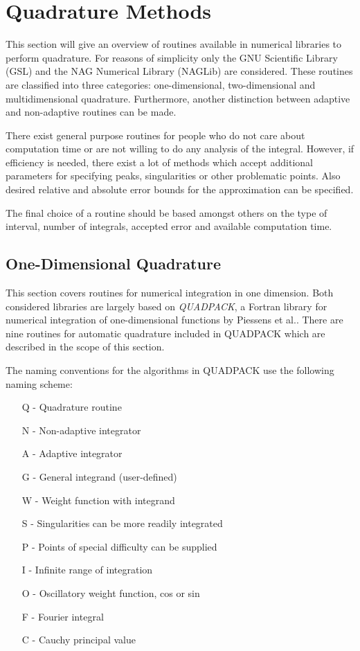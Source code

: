 \section{Quadrature Methods} \label{routines}
This section will give an overview of routines available in numerical libraries to perform quadrature.  For reasons of simplicity only the GNU Scientific Library (GSL)\cite{GSL_Reference} and the NAG Numerical Library (NAGLib)\cite{NAGlib} are considered.
These routines are classified into three categories: one-dimensional, two-dimensional and multidimensional quadrature. Furthermore, another distinction between adaptive and non-adaptive routines can be made.

There exist general purpose routines for people who do not care about computation time or are not willing to do any analysis of the integral. However, if efficiency is needed, there exist a lot of methods which accept additional parameters for specifying peaks, singularities or other problematic points. Also desired relative and absolute error bounds for the approximation can be specified.

The final choice of a routine should be based amongst others on the type of interval, number of integrals, accepted error and available computation time.



\subsection{One-Dimensional Quadrature}
This section covers routines for numerical integration in one dimension. Both considered libraries are largely based on \emph{QUADPACK}, a Fortran library for numerical integration of one-dimensional functions by Piessens et al.\cite{quadpack}. There are nine routines for automatic quadrature included in QUADPACK which are described in the scope of this section.

The naming conventions for the algorithms in QUADPACK use the following naming scheme:
\begin{itemize}[noitemsep]
\item[Q] - Quadrature routine
\newline
\item[N] - Non-adaptive integrator
\item[A] - Adaptive integrator
\newline
\item[G] - General integrand (user-defined)
\item[W] - Weight function with integrand
\newline
\item[S] - Singularities can be more readily integrated
\item[P] - Points of special difficulty can be supplied
\item[I] - Infinite range of integration
\item[O] - Oscillatory weight function, cos or sin
\item[F] - Fourier integral
\item[C] - Cauchy principal value
\end{itemize}


